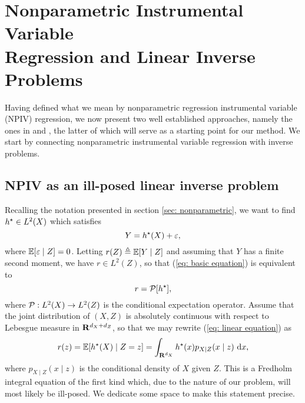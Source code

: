 \chapter{Nonparametric Instrumental Variable \\Regression and Linear Inverse Problems}

Having defined what we mean by nonparametric regression instrumental variable (NPIV) regression, we now present two well established approaches, namely the ones in \cite{newey2003} and \cite{darolles2011}, the latter of which will serve as a starting point for our method.
We start by connecting nonparametric instrumental variable regression with inverse problems.

\section{NPIV as an ill-posed linear inverse problem}
\label{sec: npiv and ill posed lip}

Recalling the notation presented in section \ref{sec: nonparametric}, we want to find $ h^{ \star } \in L^{ 2 } ( X ) $ which satisfies
\begin{equation}
    \label{eq: basic equation}
    Y = h^{ \star } ( X ) + \varepsilon
,\end{equation}
where $ \mathbb{E} [ \varepsilon \mid Z ] = 0 $.
Letting $ r ( Z ) \triangleq \mathbb{E} [ Y \mid Z ] $ and assuming that $ Y $ has a finite second moment, we have $ r \in L^{ 2 } ( Z ) $, so that (\ref{eq: basic equation}) is equivalent to
\begin{equation}
    \label{eq: linear equation}
    r = \mathcal{P} [ h^{ \star } ]
,\end{equation}
where $ \mathcal{P} : L^{ 2 } ( X ) \to L^{ 2 } ( Z ) $ is the conditional expectation operator.
Assume that the joint distribution of $ ( X, Z ) $ is absolutely continuous with respect to Lebesgue measure in $ \mathbf{R}^{ d_{ X } + d_{ Z } } $, so that we may rewrite (\ref{eq: linear equation}) as
\begin{equation}
    \label{eq: expectation equation}
    r ( z ) = \mathbb{E} [ h^{ \star } ( X ) \mid Z = z ] = \int_{ \mathbf{R}^{ d_{ X } } } h^{ \star } ( x ) p_{ X \mid Z } ( x \mid z ) \ \mathrm{d} x
,\end{equation}
where $ p_{ X\mid Z } ( x \mid z ) $ is the conditional density of $ X $ given $ Z $.
This is a Fredholm integral equation of the first kind \cite{kress89} which, due to the nature of our problem, will most likely be ill-posed.
We dedicate some space to make this statement precise.


